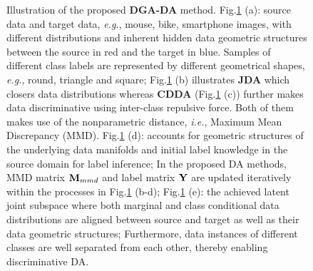 \documentclass[journal,twocolumn]{IEEEtran}
\begin{document}
\begin{CJK*}{UTF8}{gkai}
\begin{figure}[h!]
	\caption {Illustration of the proposed \textbf{DGA-DA} method. Fig.\ref{fig:diff} (a): source data and target data, \textit{e.g.},   mouse, bike, smartphone images, with different distributions and inherent hidden data geometric structures between the source in red  and the target in blue. Samples of different class labels are represented by different geometrical shapes, \textit{e.g.}, round, triangle and square; Fig.\ref{fig:diff} (b) illustrates \textbf{JDA} which closers data distributions whereas \textbf{CDDA} (Fig.\ref{fig:diff} (c)) further makes data discriminative using inter-class repulsive force. Both of them makes use of the nonparametric distance, \textit{i.e.}, Maximum Mean Discrepancy (MMD).	Fig.\ref{fig:diff} (d): accounts for geometric structures of the underlying data manifolds and initial label knowledge in the source domain for label inference; In the proposed DA methods, MMD matrix ${{\bf{M}}_{mmd}}$ and label matrix ${\bf{Y}}$ are updated iteratively within the processes in Fig.\ref{fig:diff} (b-d);  Fig.\ref{fig:diff} (e): the achieved latent joint subspace where both marginal and class conditional data distributions are aligned between source and target as well as their data geometric structures; Furthermore, data instances of different classes are well separated from each other, thereby enabling discriminative DA.} 
	\label{fig:diff}
\end{figure} 





\end{CJK*}
\end{document}

